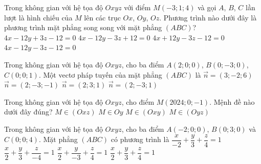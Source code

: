 \begin{ex}%
	Trong không gian với hệ tọa độ $Oxyz$ với điểm $M(-3;1;4)$ và gọi $A$, $B$, $C$ lần lượt là hình chiếu của $M$ lên các trục $Ox$, $Oy$, $Oz$. Phương trình nào dưới đây là phương trình mặt phẳng song song với mặt phẳng $(ABC)$?
	\choice
	{$4x-12y+3z-12=0$}
	{$4x-12y-3z+12=0$}
	{$4x+12y-3z-12=0$}
	{\True $4x-12y-3z-12=0$}
\end{ex}

\begin{ex}%
	Trong không gian với hệ tọa độ $Oxyz$, cho ba điểm $A(2;0;0)$, $B(0;-3;0)$, $C(0;0;1)$. Một vectơ pháp tuyến của mặt phẳng $(ABC)$ là
	\choice
	{\True $\overrightarrow{n}=(3;-2;6)$}
	{$\overrightarrow{n}=(2;-3;-1)$}
	{$\overrightarrow{n}=(2;3;1)$}
	{$\overrightarrow{n}=(2;-3;1)$}
\end{ex}

\begin{ex}%
	Trong không gian với hệ tọa độ $Oxyz$, cho điểm $M(2024;0;-1)$. Mệnh đề nào dưới đây đúng?
	\choice
	{\True $M\in(Oxz)$}
	{$M\in Oy$}
	{$M\in(Oxy)$}
	{$M\in(Oyz)$}
\end{ex}

\begin{ex}%
	Trong không gian với hệ tọa độ $Oxyz$, cho ba điểm $A(-2;0;0)$, $B(0;3;0)$ và $C(0;0;4)$. Mặt phẳng $(ABC)$ có phương trình là
	\choice
	{\True $\dfrac{x}{-2}+\dfrac{y}{3}+\dfrac{z}{4}=1$}
	{$\dfrac{x}{2}+\dfrac{y}{3}+\dfrac{z}{-4}=1$}
	{$\dfrac{x}{2}+\dfrac{y}{-3}+\dfrac{z}{4}=1$}
	{$\dfrac{x}{2}+\dfrac{y}{3}+\dfrac{z}{4}=1$}
\end{ex}

